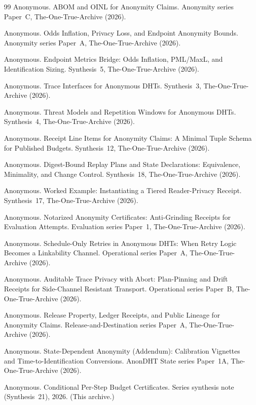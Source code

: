 \documentclass[11pt]{article}
\begin{document}
\begin{thebibliography}{99}
Anonymous.
\newblock ABOM and OINL for Anonymity Claims.
\newblock Anonymity series Paper~C, The-One-True-Archive (2026).

Anonymous.
\newblock Odds Inflation, Privacy Loss, and Endpoint Anonymity Bounds.
\newblock Anonymity series Paper~A, The-One-True-Archive (2026).

Anonymous.
\newblock Endpoint Metrics Bridge: Odds Inflation, PML/MaxL, and Identification Sizing.
\newblock Synthesis~5, The-One-True-Archive (2026).

Anonymous.
\newblock Trace Interfaces for Anonymous DHTs.
\newblock Synthesis~3, The-One-True-Archive (2026).

Anonymous.
\newblock Threat Models and Repetition Windows for Anonymous DHTs.
\newblock Synthesis~4, The-One-True-Archive (2026).

Anonymous.
\newblock Receipt Line Items for Anonymity Claims: A Minimal Tuple Schema for Published Budgets.
\newblock Synthesis~12, The-One-True-Archive (2026).

Anonymous.
\newblock Digest-Bound Replay Plans and State Declarations: Equivalence, Minimality, and Change Control.
\newblock Synthesis~18, The-One-True-Archive (2026).

Anonymous.
\newblock Worked Example: Instantiating a Tiered Reader-Privacy Receipt.
\newblock Synthesis~17, The-One-True-Archive (2026).

Anonymous.
\newblock Notarized Anonymity Certificates: Anti-Grinding Receipts for Evaluation Attempts.
\newblock Evaluation series Paper~1, The-One-True-Archive (2026).

Anonymous.
\newblock Schedule-Only Retries in Anonymous DHTs: When Retry Logic Becomes a Linkability Channel.
\newblock Operational series Paper~A, The-One-True-Archive (2026).

Anonymous.
\newblock Auditable Trace Privacy with Abort: Plan-Pinning and Drift Receipts for Side-Channel Resistant Transport.
\newblock Operational series Paper~B, The-One-True-Archive (2026).

Anonymous.
\newblock Release Property, Ledger Receipts, and Public Lineage for Anonymity Claims.
\newblock Release-and-Destination series Paper~A, The-One-True-Archive (2026).

Anonymous.
\newblock State-Dependent Anonymity (Addendum): Calibration Vignettes and Time-to-Identification Conversions.
\newblock AnonDHT State series Paper~1A, The-One-True-Archive (2026).


Anonymous.
\newblock Conditional Per-Step Budget Certificates.
\newblock Series synthesis note (Synthesis~21), 2026. (This archive.)

\end{thebibliography}
\end{document}
